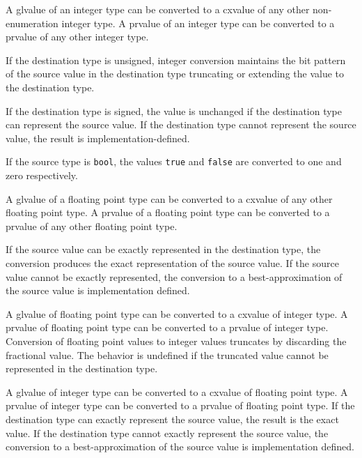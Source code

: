 
\p A glvalue of an integer type can be converted to a cxvalue of any other
non-enumeration integer type. A prvalue of an integer type can be converted to a
prvalue of any other integer type.

\p If the destination type is unsigned, integer conversion maintains the bit pattern
of the source value in the destination type truncating or extending the value to
the destination type.

\p If the destination type is signed, the value is unchanged if the destination
type can represent the source value. If the destination type cannot represent
the source value, the result is implementation-defined.

\p If the source type is \texttt{bool}, the values \texttt{true} and
\texttt{false} are converted to one and zero respectively.


\p A glvalue of a floating point type can be converted to a cxvalue of any other
floating point type. A prvalue of a floating point type can be converted to a
prvalue of any other floating point type.

\p If the source value can be exactly represented in the destination type, the
conversion produces the exact representation of the source value. If the source
value cannot be exactly represented, the conversion to a best-approximation of
the source value is implementation defined.


\p A glvalue of floating point type can be converted to a cxvalue of integer
type. A prvalue of floating point type can be converted to a prvalue of
integer type. Conversion of floating point values to integer values truncates by
discarding the fractional value. The behavior is undefined if the truncated
value cannot be represented in the destination type.

\p A glvalue of integer type can be converted to a cxvalue of floating point
type. A prvalue of integer type can be converted to a prvalue of floating
point type. If the destination type can exactly represent the source value, the
result is the exact value. If the destination type cannot exactly represent the
source value, the conversion to a best-approximation of the source value is
implementation defined.


